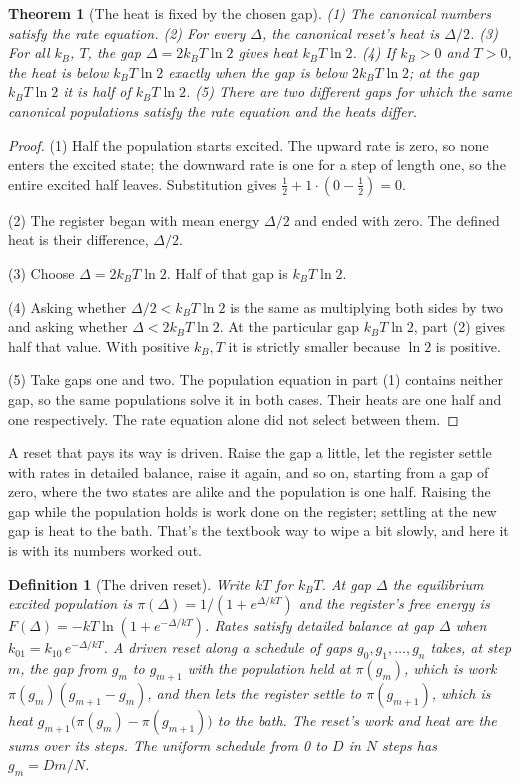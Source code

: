 \documentclass[11pt,twoside]{article}
\theoremstyle{thielethm}
\newtheorem{theorem}{Theorem}[section]
\theoremstyle{thieledef}
\newtheorem{definition}{Definition}[section]
\theoremstyle{thieledef}
\theoremstyle{thieledef}
\theoremstyle{thielethm}
\theoremstyle{thieleobs}
\theoremstyle{thielethm}
\begin{document}
\begin{theorem}[The heat is fixed by the chosen gap]\label{thm:u24-calorimeter}
(1) The canonical numbers satisfy the rate equation. (2) For every $\Delta$, the canonical
reset's heat is $\Delta / 2$. (3) For all $k_B$, $T$, the gap $\Delta = 2 k_B T \ln 2$ gives
heat $k_B T \ln 2$. (4) If $k_B > 0$ and $T > 0$, the heat is below $k_B T \ln 2$ exactly when the gap is below $2 k_B T \ln 2$; at the gap $k_B T \ln 2$ it is half of $k_B T \ln 2$. (5) There are two different gaps for which the same canonical populations
satisfy the rate equation and the heats differ.
\end{theorem}

\begin{proof}
(1) Half the population starts excited. The upward rate is zero, so none
enters the excited state; the downward rate is one for a step of length
one, so the entire excited half leaves. Substitution gives
$\tfrac12+1\cdot(0-\tfrac12)=0$.

(2) The register began with mean energy $\Delta/2$ and ended with zero.
The defined heat is their difference, $\Delta/2$.

(3) Choose $\Delta=2k_B T\ln2$. Half of that gap is $k_B T\ln2$.

(4) Asking whether $\Delta/2<k_B T\ln2$ is the same as multiplying both
sides by two and asking whether $\Delta<2k_B T\ln2$. At the particular
gap $k_B T\ln2$, part (2) gives half that value. With positive $k_B,T$
it is strictly smaller because $\ln2$ is positive.

(5) Take gaps one and two. The population equation in part (1) contains
neither gap, so the same populations solve it in both cases. Their heats
are one half and one respectively. The rate equation alone did not select
between them.
\end{proof}

A reset that pays its way is driven. Raise the gap a little, let the register settle with
rates in detailed balance, raise it again, and so on, starting from a gap of zero, where the
two states are alike and the population is one half. Raising the gap while the population
holds is work done on the register; settling at the new gap is heat to the bath. That's the textbook way to wipe a bit slowly, and here it is with its numbers worked out.

\begin{definition}[The driven reset]\label{def:u24-driven}
Write $kT$ for $k_B T$. At gap $\Delta$ the equilibrium excited population is
$\pi(\Delta) = 1/(1 + e^{\Delta/kT})$ and the register's free energy is
$F(\Delta) = -kT \ln(1 + e^{-\Delta/kT})$. Rates satisfy \emph{detailed balance} at gap $\Delta$
when $k_{01} = k_{10} \, e^{-\Delta/kT}$. A \emph{driven reset} along a schedule of gaps
$g_0, g_1, \dots, g_n$ takes, at step $m$, the gap from $g_m$ to $g_{m+1}$ with the population
held at $\pi(g_m)$, which is work $\pi(g_m)(g_{m+1} - g_m)$, and then lets the register settle to
$\pi(g_{m+1})$, which is heat $g_{m+1}\big(\pi(g_m) - \pi(g_{m+1})\big)$ to the bath. The reset's
work and heat are the sums over its steps. The uniform schedule from 0 to $D$ in $N$ steps has
$g_m = D m / N$.
\end{definition}
\end{document}
